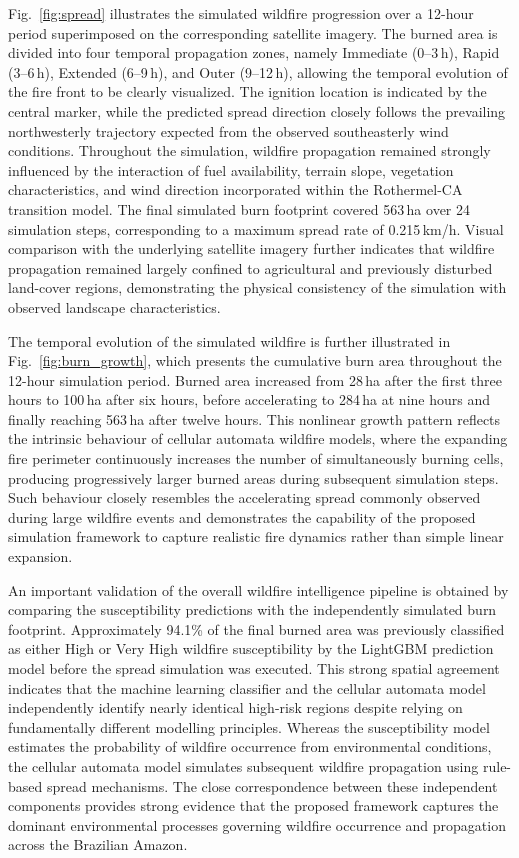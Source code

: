 \documentclass{ieeeaccess}
\begin{document}
Fig.~\ref{fig:spread} illustrates the simulated wildfire progression over a 12-hour period superimposed on the corresponding satellite imagery. The burned area is divided into four temporal propagation zones, namely Immediate (0--3\,h), Rapid (3--6\,h), Extended (6--9\,h), and Outer (9--12\,h), allowing the temporal evolution of the fire front to be clearly visualized. The ignition location is indicated by the central marker, while the predicted spread direction closely follows the prevailing northwesterly trajectory expected from the observed southeasterly wind conditions. Throughout the simulation, wildfire propagation remained strongly influenced by the interaction of fuel availability, terrain slope, vegetation characteristics, and wind direction incorporated within the Rothermel-CA transition model. The final simulated burn footprint covered 563\,ha over 24 simulation steps, corresponding to a maximum spread rate of 0.215\,km/h. Visual comparison with the underlying satellite imagery further indicates that wildfire propagation remained largely confined to agricultural and previously disturbed land-cover regions, demonstrating the physical consistency of the simulation with observed landscape characteristics.

The temporal evolution of the simulated wildfire is further illustrated in Fig.~\ref{fig:burn_growth}, which presents the cumulative burn area throughout the 12-hour simulation period. Burned area increased from 28\,ha after the first three hours to 100\,ha after six hours, before accelerating to 284\,ha at nine hours and finally reaching 563\,ha after twelve hours. This nonlinear growth pattern reflects the intrinsic behaviour of cellular automata wildfire models, where the expanding fire perimeter continuously increases the number of simultaneously burning cells, producing progressively larger burned areas during subsequent simulation steps. Such behaviour closely resembles the accelerating spread commonly observed during large wildfire events and demonstrates the capability of the proposed simulation framework to capture realistic fire dynamics rather than simple linear expansion.

An important validation of the overall wildfire intelligence pipeline is obtained by comparing the susceptibility predictions with the independently simulated burn footprint. Approximately 94.1\% of the final burned area was previously classified as either High or Very High wildfire susceptibility by the LightGBM prediction model before the spread simulation was executed. This strong spatial agreement indicates that the machine learning classifier and the cellular automata model independently identify nearly identical high-risk regions despite relying on fundamentally different modelling principles. Whereas the susceptibility model estimates the probability of wildfire occurrence from environmental conditions, the cellular automata model simulates subsequent wildfire propagation using rule-based spread mechanisms. The close correspondence between these independent components provides strong evidence that the proposed framework captures the dominant environmental processes governing wildfire occurrence and propagation across the Brazilian Amazon.
\end{document}

